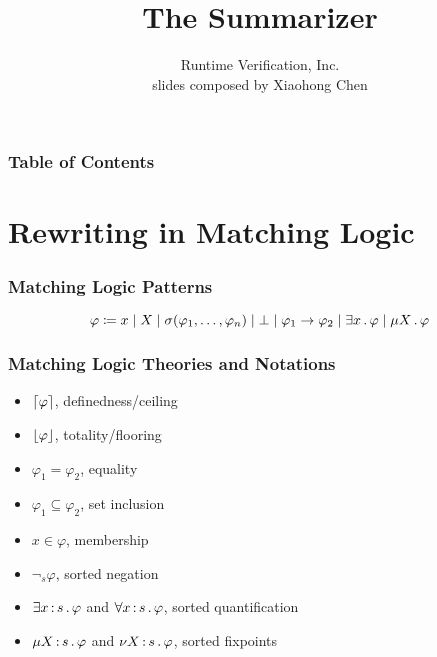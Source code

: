 \documentclass{beamer}
\title{The \K Summarizer}
\author{Runtime Verification, Inc.\\slides composed by Xiaohong Chen}
\begin{document}
\frame{\titlepage}

\begin{frame}
\frametitle{Table of Contents}
\tableofcontents
\end{frame}

\section{Rewriting in Matching Logic}

\begin{frame}
\frametitle{Matching Logic Patterns}
\[
\varphi \coloneqq x \mid X \mid \sigma(\varphi_1,\dots,\varphi_n)
\mid \bot \mid \varphi_1 \rightarrow \varphi_2 \mid \exists x \,.\, \varphi
\mid \mu X \,.\, \varphi
\]
\end{frame}

\begin{frame}
\frametitle{Matching Logic Theories and Notations}
\begin{itemize}
\item $\lceil\varphi\rceil$, definedness/ceiling
\item $\lfloor\varphi\rfloor$, totality/flooring
\item $\varphi_1 = \varphi_2$, equality
\item $\varphi_1 \subseteq \varphi_2$, set inclusion
\item $x \in \varphi$, membership
\item $\neg_s \varphi$, sorted negation
\item $\exists x \,{:}\, s \,.\, \varphi$ and
      $\forall x \,{:}\, s \,.\, \varphi$, sorted quantification
\item $\mu X \,{:}\, s \,.\, \varphi$ and $\nu X \,{:}\, s \,.\, \varphi$,
      sorted fixpoints
\end{itemize}
\end{frame}
\end{document}
